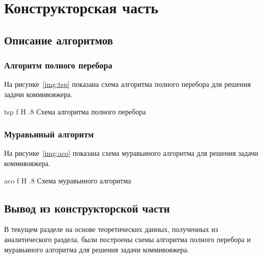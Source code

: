 \chapter{Конструкторская часть}

\section{Описание алгоритмов}

\subsection{Алгоритм полного перебора}

На рисунке~\ref{img:tsp} показана схема алгоритма полного перебора для решения задачи коммивояжера.

    {tsp}
    {f}
    {H}
    {.8\textwidth}
    {Схема алгоритма полного перебора}

\subsection{Муравьиный алгоритм}

На рисунке~\ref{img:aco} показана схема муравьиного алгоритма для решения задачи коммивояжера.

    {aco}
    {f}
    {H}
    {.8\textwidth}
    {Схема муравьиного алгоритма}

\section*{Вывод из конструкторской части}

В текущем разделе на основе теоретических данных, полученных из аналитического раздела, были построены схемы алгоритма полного перебора и муравьиного алгоритма для решения задачи коммивояжера.
